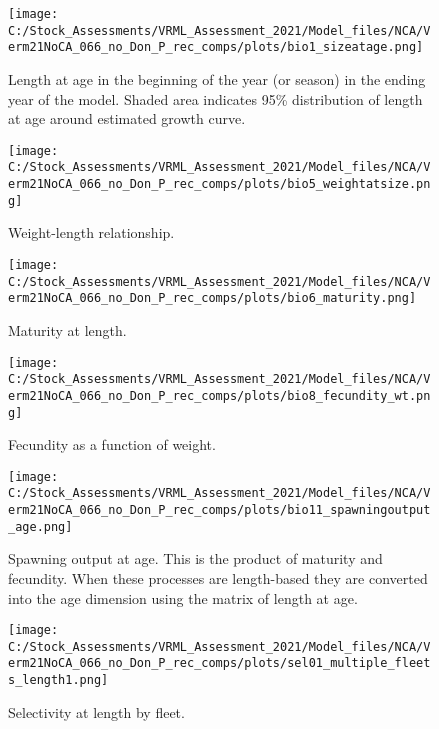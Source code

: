 \documentclass[11pt,
  english,
  a4paper,
]{article}
\begin{document}
\begin{figure}
\centering
\texttt{[image: C:/Stock\_Assessments/VRML\_Assessment\_2021/Model\_files/NCA/Verm21NoCA\_066\_no\_Don\_P\_rec\_comps/plots/bio1\_sizeatage.png]}
\caption{Length at age in the beginning of the year (or season) in the ending year of the model. Shaded area indicates 95\% distribution of length at age around estimated growth curve.\label{fig:fittedgrowth}}
\end{figure}

\begin{figure}
\centering
\texttt{[image: C:/Stock\_Assessments/VRML\_Assessment\_2021/Model\_files/NCA/Verm21NoCA\_066\_no\_Don\_P\_rec\_comps/plots/bio5\_weightatsize.png]}
\caption{Weight-length relationship.\label{fig:weightlength}}
\end{figure}

\begin{figure}
\centering
\texttt{[image: C:/Stock\_Assessments/VRML\_Assessment\_2021/Model\_files/NCA/Verm21NoCA\_066\_no\_Don\_P\_rec\_comps/plots/bio6\_maturity.png]}
\caption{Maturity at length.\label{fig:maturity}}
\end{figure}

\begin{figure}
\centering
\texttt{[image: C:/Stock\_Assessments/VRML\_Assessment\_2021/Model\_files/NCA/Verm21NoCA\_066\_no\_Don\_P\_rec\_comps/plots/bio8\_fecundity\_wt.png]}
\caption{Fecundity as a function of weight.\label{fig:fecundity}}
\end{figure}

\begin{figure}
\centering
\texttt{[image: C:/Stock\_Assessments/VRML\_Assessment\_2021/Model\_files/NCA/Verm21NoCA\_066\_no\_Don\_P\_rec\_comps/plots/bio11\_spawningoutput\_age.png]}
\caption{Spawning output at age. This is the product of maturity and fecundity. When these processes are length-based they are converted into the age dimension using the matrix of length at age.\label{fig:spawningoutputage}}
\end{figure}

\FloatBarrier

\FloatBarrier

\begin{figure}
\centering
\texttt{[image: C:/Stock\_Assessments/VRML\_Assessment\_2021/Model\_files/NCA/Verm21NoCA\_066\_no\_Don\_P\_rec\_comps/plots/sel01\_multiple\_fleets\_length1.png]}
\caption{Selectivity at length by fleet.\label{fig:selex-length-all}}
\end{figure}
\end{document}
